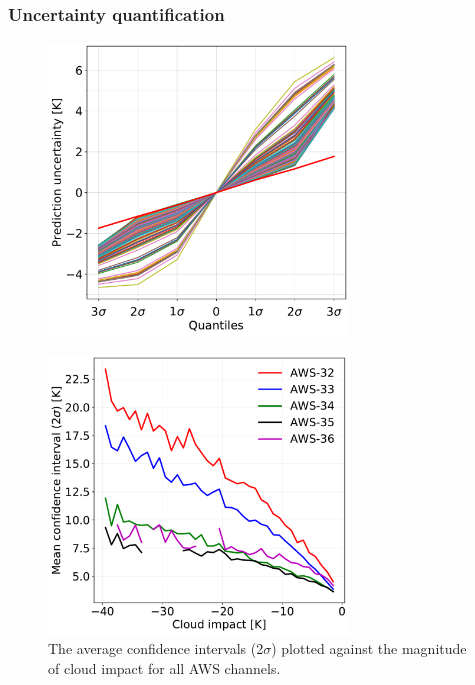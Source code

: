 \documentclass[amt, manuscript]{copernicus}
\begin{document}
\subsubsection{Uncertainty quantification}
\begin{figure}[t]
	\includegraphics[width = 80mm]{Figures/prediction_uncertainty_aws-34.pdf}	
	\caption{}
	\label{fig:prediction_uncertainty_aws-34}	
\end{figure}
\begin{figure}[t]
	\includegraphics[width = 80mm]{Figures/cloud_impact_uncertainty_AWS.pdf}	
	\caption{The average confidence intervals (2$\sigma$) plotted against the magnitude of cloud impact for all AWS channels.}
	\label{fig:uncertainty_cloud_impact}	
\end{figure}

\end{document}
